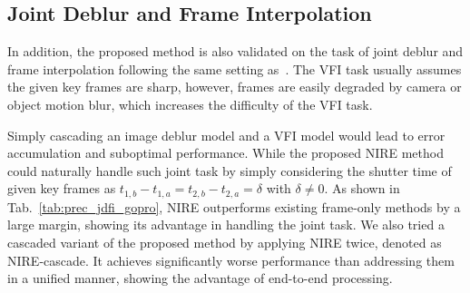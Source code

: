 \documentclass[10pt,twocolumn,letterpaper]{article}
\begin{document}
\subsection{Joint Deblur and Frame Interpolation}
In addition, the proposed method is also validated on the task of joint deblur and frame interpolation following the same setting as~\cite{DeMFI}. The VFI task usually assumes the given key frames are sharp, however, frames are easily degraded by camera or object motion blur, which increases the difficulty of the VFI task.

\begin{table}[t!]
\centering
\caption{Performance on joint deblur and frame interpolation.}
\end{table}

Simply cascading an image deblur model and a VFI model would lead to error accumulation and suboptimal performance.
While the proposed NIRE method could naturally handle such joint task by simply considering the shutter time of given key frames as $t_{1,b} - t_{1,a} = t_{2,b} - t_{2,a} = \delta$ with $\delta \neq 0$.
As shown in Tab.~\ref{tab:prec_jdfi_gopro}, NIRE outperforms existing frame-only methods by a large margin, 
showing its advantage in handling the joint task.
We also tried a cascaded variant of the proposed method by applying NIRE twice, denoted as NIRE-cascade.
It achieves significantly worse performance than addressing them in a unified manner, showing the advantage of end-to-end processing.
\end{document}
